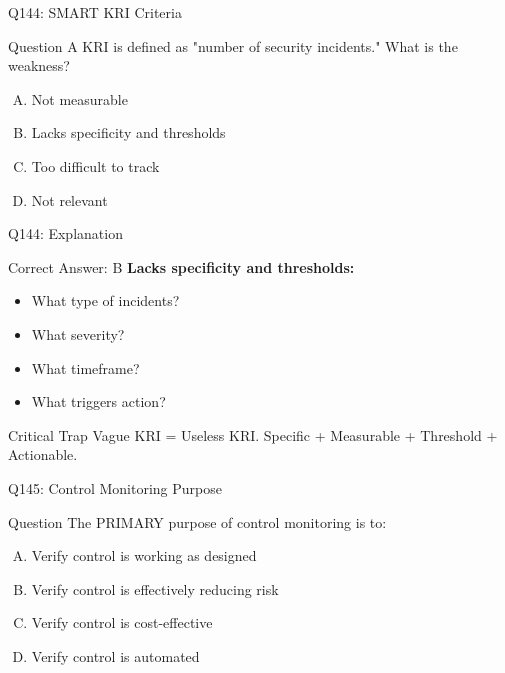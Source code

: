 \documentclass{beamer}
\begin{document}
	\begin{frame}{Q144: SMART KRI Criteria}
		\begin{block}{Question}
			A KRI is defined as "number of security incidents." What is the weakness?
		\end{block}
		\begin{enumerate}[(A)]
			\item Not measurable
			\item Lacks specificity and thresholds
			\item Too difficult to track
			\item Not relevant
		\end{enumerate}
	\end{frame}
	
	\begin{frame}{Q144: Explanation}
		\begin{block}{Correct Answer: B}
			\textbf{Lacks specificity and thresholds:}
			\begin{itemize}
				\item What type of incidents?
				\item What severity?
				\item What timeframe?
				\item What triggers action?
			\end{itemize}
		\end{block}
		\begin{alertblock}{Critical Trap}
			Vague KRI = Useless KRI.
			Specific + Measurable + Threshold + Actionable.
		\end{alertblock}
	\end{frame}
	
	\begin{frame}{Q145: Control Monitoring Purpose}
		\begin{block}{Question}
			The PRIMARY purpose of control monitoring is to:
		\end{block}
		\begin{enumerate}[(A)]
			\item Verify control is working as designed
			\item Verify control is effectively reducing risk
			\item Verify control is cost-effective
			\item Verify control is automated
		\end{enumerate}
	\end{frame}
	
\end{document}
